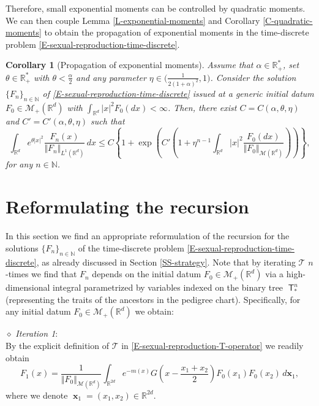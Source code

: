 \documentclass[reqno]{amsart}
\newtheorem{corollary}[definition]{Corollary}
\DeclareMathOperator{\Tree}{\mathsf{T}}
\DeclareMathOperator{\bx}{\mathbf{x}}
\numberwithin{equation}{section}
\begin{document}
{Therefore, small exponential moments can be controlled by quadratic moments. We can then couple Lemma \ref{L-exponential-moments} and Corollary \ref{C-quadratic-moments} to obtain the propagation of exponential moments in the time-discrete problem \eqref{E-sexual-reproduction-time-discrete}.

\begin{corollary}[Propagation of exponential moments]\label{C-exponential-moments}
Assume that $\alpha\in \mathbb{R}_+^*$, set $\theta\in \mathbb{R}_+^*$ with $\theta<\frac{\alpha}{2}$ and any parameter $\eta\in \big(\frac{1}{2(1+\alpha)^2},1\big)$. Consider the solution $\{F_n\}_{n\in \mathbb{N}}$ of \eqref{E-sexual-reproduction-time-discrete} issued at a generic initial datum $F_0\in \mathcal{M}_+(\mathbb{R}^d)$ with $\int_{\mathbb{R}^d}\vert x\vert^2 F_0(dx)<\infty$. Then, there exist $C=C(\alpha,\theta,\eta)$ and $C'=C'(\alpha,\theta,\eta)$ such that
$$\int_{\mathbb{R}^d}e^{\theta\vert x\vert^2}\frac{F_n(x)}{\Vert F_n\Vert_{L^1(\mathbb{R}^d)}}\,dx\leq C\left\{1+\exp\left(C'\left(1+\eta^{n-1}\int_{\mathbb{R}^d}\vert x\vert^2\frac{F_0(dx)}{\Vert F_0\Vert_{\mathcal{M}(\mathbb{R}^d)}}\right)\right)\right\},$$
for any $n\in \mathbb{N}$.
\end{corollary}


\section{Reformulating the recursion}\label{S-restating-iterations}
In this section we find an appropriate reformulation of the recursion for the solutions $\{F_n\}_{n\in \mathbb{N}}$ of the time-discrete problem \eqref{E-sexual-reproduction-time-discrete}, as already discussed in Section \ref{SS-strategy}. Note that by iterating $\mathcal{T}$ $n$-times we find that $F_n$ depends on the initial datum $F_0\in \mathcal{M}_+(\mathbb{R}^d)$ via a high-dimensional integral parametrized by variables indexed on the binary tree $\Tree^n_*$ (representing the traits of the ancestors in the pedigree chart). Specifically, for any initial datum $F_0\in \mathcal{M}_+(\mathbb{R}^d)$ we obtain:

\medskip

\noindent $\diamond$ {\em Iteration 1}:\\
By the explicit definition of $\mathcal{T}$ in \eqref{E-sexual-reproduction-T-operator} we readily obtain
\begin{equation}\label{E-sexual-reproduction-iterations_n=1}
F_1(x)=\frac{1}{\Vert F_0\Vert_{\mathcal{M}(\mathbb{R}^d)}}\int_{\mathbb{R}^{2d}}e^{-m(x)}G\left(x-\frac{x_1+x_2}{2}\right)F_0(x_1)F_0(x_2)\,d\mathbf{x}_1,
\end{equation}
where we denote $\bx_1=(x_1,x_2)\in \mathbb{R}^{2d}$.

}
\end{document}
